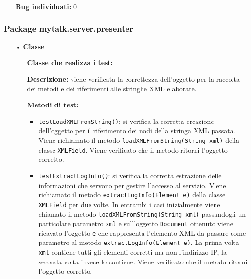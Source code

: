 {\begin{sloppypar}
{{\begin{itemize}
\begin{itemize}
					\item[] \textbf{Bug individuati:} 0
				\end{itemize}
			\end{itemize}
		}
		
		
	}
\newpage
\subsubsection{Package mytalk.server.presenter} {
			\begin{itemize}
				\item[•]\textbf{Classe } 
				\begin{itemize}
					\item[] \textbf{Classe che realizza i test:} \\ 

					\item[] \textbf{Descrizione:} viene verificata la correttezza dell'oggetto per la raccolta dei metodi e dei riferimenti alle stringhe XML elaborate. 

					\item[] \textbf{Metodi di test:}
					\begin{itemize}
						\item \texttt{testLoadXMLFromString()}: si verifica la corretta creazione dell'oggetto per il riferimento dei nodi della stringa XML passata. Viene richiamato il metodo \texttt{loadXMLFromString(String xml)} della classe \texttt{XMLField}. Viene verificato che il metodo ritorni l'oggetto corretto.
						
						\item \texttt{testExtractLogInfo()}: si verifica la corretta estrazione delle informazioni che servono per gestire l'accesso al servizio. Viene richiamato il metodo \texttt{extractLogInfo(Element e)} della classe \texttt{XMLField} per due volte. In entrambi i casi inizialmente viene chiamato il metodo \texttt{loadXMLFromString(String xml)} passandogli un particolare parametro \texttt{xml} e sull'oggetto \texttt{Document} ottenuto viene ricavato l'oggetto \texttt{e} che rappresenta l'elemento XML da passare come parametro al metodo \texttt{extractLogInfo(Element e)}. La prima volta \texttt{xml} contiene tutti gli elementi corretti ma non l'indirizzo IP, la seconda volta invece lo contiene. Viene verificato che il metodo ritorni l'oggetto corretto.
						

\end{itemize}
\end{itemize}
\end{itemize}}
\end{sloppypar}}
